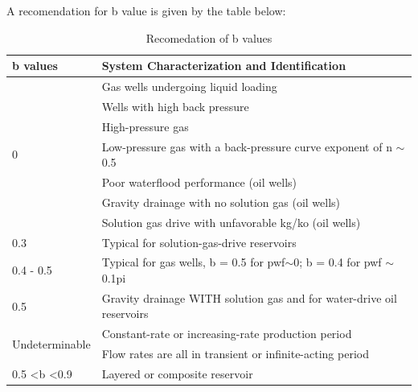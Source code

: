 \documentclass[12pt,a4paper]{report}
\begin{document}
A recomendation for b value is given by the table below:
\begin{table}[H]
\centering
\caption{Recomedation of b values}
\begin{tabular}{@{}ll@{}}
\toprule
\textbf{b values}               & \textbf{System Characterization and Identification}                          \\ \midrule
\multirow{7}{*}{0}              & Gas wells undergoing liquid loading                                          \\
                                & Wells with high back pressure                                                \\
                                & High-pressure gas                                                            \\
                                & Low-pressure gas with a back-pressure curve exponent of n $\sim$0.5          \\
                                & Poor waterflood performance (oil wells)                                      \\
                                & Gravity drainage with no solution gas (oil wells)                            \\
                                & Solution gas drive with unfavorable kg/ko (oil wells)                        \\
0.3                             & Typical for solution-gas-drive reservoirs                                    \\
0.4 - 0.5                       & Typical for gas wells, b = 0.5 for pwf$\sim$0;  b = 0.4 for pwf  $\sim$0.1pi \\
0.5                             & Gravity drainage WITH solution gas and for water-drive oil reservoirs         \\
\multirow{2}{*}{Undeterminable} & Constant-rate or increasing-rate production period                           \\
                                & Flow rates are all in transient or infinite-acting period                    \\
0.5 \textless b \textless 0.9   & Layered or composite reservoir                                               \\ \bottomrule
\end{tabular}
\end{table}
\end{document}
